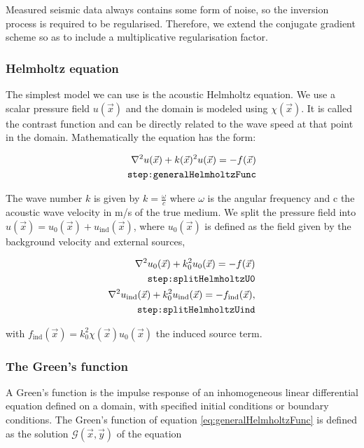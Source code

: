 \documentclass[10pt,a4paper]{article}
\begin{document}
Measured seismic data always contains some form of noise, so the
inversion process is required to be regularised. Therefore, we extend
the conjugate gradient scheme so as to include a multiplicative regularisation factor.

\subsubsection{Helmholtz equation}
The simplest model we can use is the acoustic Helmholtz equation. We
use a scalar pressure field $u(\vec{x})$ and the domain is modeled
using $\chi(\vec{x})$. It is called the contrast function and can be
directly related to the wave speed at that point in the domain.
Mathematically the equation has the form:

\begin{align} \label{eq:generalHelmholtzFunc}
\nabla^2 u(\vec{x}) + k(\vec{x})^2 u(\vec{x}) =
-f(\vec{x})\\
\tag*{\texttt{step:generalHelmholtzFunc}}
\end{align}

The wave number $k$ is given by $k = \frac{\omega}{c}$ where $\omega$
is the angular frequency and c the
acoustic wave velocity in m/s of the true medium.
We split the pressure field into $u(\vec{x}) = u_0(\vec{x}) +
u_{\text{ind}}(\vec{x})$, where $u_0(\vec{x})$ is defined as the
field given by the background velocity and external sources,

\begin{align} \label{eq:splitHelmholtzU0}
\nabla^2 u_0(\vec{x}) + k_0^2 u_0(\vec{x}) = -f(\vec{x})\\
\tag*{\texttt{step:splitHelmholtzU0}} \\
\label{eq:splitHelmholtzUind}
\nabla^2 u_\text{ind}(\vec{x}) + k_0^2 u_\text{ind}(\vec{x}) =
-f_\text{ind}(\vec{x}),\\
\tag*{\texttt{step:splitHelmholtzUind}}
\end{align}

with $f_\text{ind}(\vec{x}) = k_0^2 \chi(\vec{x}) u_0(\vec{x})$
the induced source term.


\subsubsection{The Green's function}
A Green's function is the impulse response of an inhomogeneous linear
differential equation defined on a domain, with specified initial
conditions or boundary conditions.
The Green's function of equation \eqref{eq:generalHelmholtzFunc} is defined as the solution $\mathcal{G}(\vec{x}, \vec{y})$ of the equation
\end{document}
